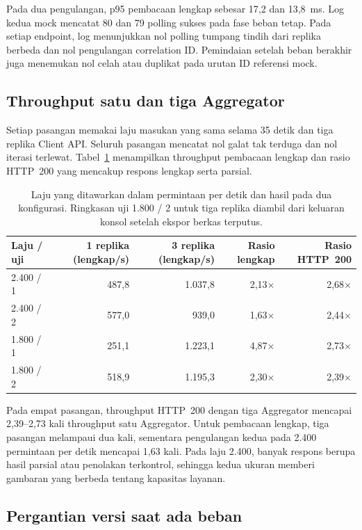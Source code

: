 Pada dua pengulangan, p95 pembacaan lengkap sebesar 17{,}2 dan 13{,}8~ms. Log kedua mock mencatat 80 dan 79 polling sukses pada fase beban tetap. Pada setiap endpoint, log menunjukkan nol polling tumpang tindih dari replika berbeda dan nol pengulangan correlation ID. Pemindaian setelah beban berakhir juga menemukan nol celah atau duplikat pada urutan ID referensi mock.

\subsection{Throughput satu dan tiga Aggregator}

Setiap pasangan memakai laju masukan yang sama selama 35 detik dan tiga replika Client API. Seluruh pasangan mencatat nol galat tak terduga dan nol iterasi terlewat. Tabel~\ref{tab:p2-throughput} menampilkan throughput pembacaan lengkap dan rasio HTTP~200 yang mencakup respons lengkap serta parsial.

\begin{table}[htbp]
\centering\small
\begin{tabular}{@{}lrrrr@{}}
\toprule
Laju / uji & 1 replika (lengkap/s) & 3 replika (lengkap/s) & Rasio lengkap & Rasio HTTP~200 \\
\midrule
2.400 / 1 & 487{,}8 & 1.037{,}8 & 2{,}13$\times$ & 2{,}68$\times$ \\
2.400 / 2 & 577{,}0 & 939{,}0 & 1{,}63$\times$ & 2{,}44$\times$ \\
1.800 / 1 & 251{,}1 & 1.223{,}1 & 4{,}87$\times$ & 2{,}73$\times$ \\
1.800 / 2 & 518{,}9 & 1.195{,}3 & 2{,}30$\times$ & 2{,}39$\times$ \\
\bottomrule
\end{tabular}
\caption{Laju yang ditawarkan dalam permintaan per detik dan hasil pada dua konfigurasi. Ringkasan uji 1.800 / 2 untuk tiga replika diambil dari keluaran konsol setelah ekspor berkas terputus.}
\label{tab:p2-throughput}
\end{table}

Pada empat pasangan, throughput HTTP~200 dengan tiga Aggregator mencapai 2{,}39--2{,}73 kali throughput satu Aggregator. Untuk pembacaan lengkap, tiga pasangan melampaui dua kali, sementara pengulangan kedua pada 2.400 permintaan per detik mencapai 1{,}63 kali. Pada laju 2.400, banyak respons berupa hasil parsial atau penolakan terkontrol, sehingga kedua ukuran memberi gambaran yang berbeda tentang kapasitas layanan.

\subsection{Pergantian versi saat ada beban}

